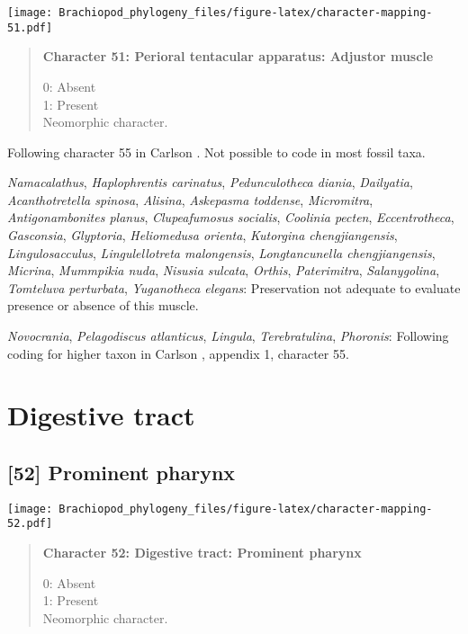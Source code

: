 \documentclass[openany]{book}
\theoremstyle{definition}
\theoremstyle{definition}
\theoremstyle{definition}
\theoremstyle{remark}
\begin{document}
\texttt{[image: Brachiopod\_phylogeny\_files/figure-latex/character-mapping-51.pdf]}

\begin{quote}
\textbf{Character 51: Perioral tentacular apparatus: Adjustor muscle}

0: Absent\\
1: Present\\
Neomorphic character.
\end{quote}

Following character 55 in Carlson
\citeyearpar{Carlson1995Phylogeneticrelationships}. Not possible to code
in most fossil taxa.

\hypertarget{Acanthotretella_spinosa-coding-51}{}
\emph{Namacalathus}, \emph{Haplophrentis carinatus},
\emph{Pedunculotheca diania}, \emph{Dailyatia}, \emph{Acanthotretella
spinosa}, \emph{Alisina}, \emph{Askepasma toddense}, \emph{Micromitra},
\emph{Antigonambonites planus}, \emph{Clupeafumosus socialis},
\emph{Coolinia pecten}, \emph{Eccentrotheca}, \emph{Gasconsia},
\emph{Glyptoria}, \emph{Heliomedusa orienta}, \emph{Kutorgina
chengjiangensis}, \emph{Lingulosacculus}, \emph{Lingulellotreta
malongensis}, \emph{Longtancunella chengjiangensis}, \emph{Micrina},
\emph{Mummpikia nuda}, \emph{Nisusia sulcata}, \emph{Orthis},
\emph{Paterimitra}, \emph{Salanygolina}, \emph{Tomteluva perturbata},
\emph{Yuganotheca elegans}: Preservation not adequate to evaluate
presence or absence of this muscle.

\hypertarget{Lingula-coding-51}{}
\emph{Novocrania}, \emph{Pelagodiscus atlanticus}, \emph{Lingula},
\emph{Terebratulina}, \emph{Phoronis}: Following coding for higher taxon
in Carlson \citeyearpar{Carlson1995Phylogeneticrelationships}, appendix
1, character 55.

\section{Digestive tract}\label{digestive-tract}

\subsection*{{[}52{]} Prominent pharynx}\label{prominent-pharynx}

\texttt{[image: Brachiopod\_phylogeny\_files/figure-latex/character-mapping-52.pdf]}

\begin{quote}
\textbf{Character 52: Digestive tract: Prominent pharynx}

0: Absent\\
1: Present\\
Neomorphic character.
\end{quote}
\end{document}

